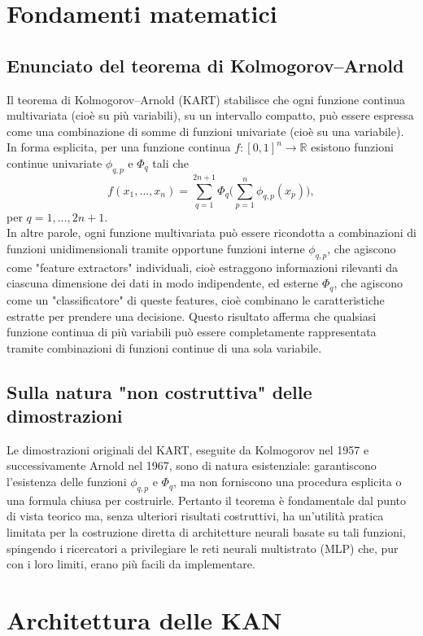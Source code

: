 \documentclass[a4paper,12pt]{report}
\begin{document}
	\section{Fondamenti matematici}
	
	\subsection{Enunciato del teorema di Kolmogorov--Arnold}
	Il teorema di Kolmogorov–Arnold (KART) stabilisce che ogni funzione continua multivariata (cioè su più variabili), su un intervallo compatto, può essere espressa come una combinazione di somme di funzioni univariate (cioè su una variabile). In forma esplicita, per una funzione continua \(f:[0,1]^n \to \mathbb{R}\) esistono funzioni continue univariate \(\phi_{q,p}\) e \(\Phi_q\) tali che
	\[
	f(x_1,\dots,x_n)=\sum_{q=1}^{2n+1}\Phi_q\!\Biggl(\sum_{p=1}^n \phi_{q,p}(x_p)\Biggr),
	\]
	per \(q=1,\dots,2n+1\). \\
	In altre parole, ogni funzione multivariata può essere ricondotta a combinazioni di funzioni unidimensionali tramite opportune funzioni interne \(\phi_{q,p}\), che agiscono come "feature extractors" individuali, cioè estraggono informazioni rilevanti da ciascuna dimensione dei dati in modo indipendente, ed esterne \(\Phi_q\), che agiscono come un "classificatore" di queste features, cioè combinano le caratteristiche estratte per prendere una decisione. Questo risultato afferma che qualsiasi funzione continua di più variabili può essere completamente rappresentata tramite combinazioni di funzioni continue di una sola variabile.
	
	\subsection{Sulla natura "non costruttiva" delle dimostrazioni}
	Le dimostrazioni originali del KART, eseguite da Kolmogorov nel 1957 e successivamente Arnold nel 1967, sono di natura esistenziale: garantiscono l'esistenza delle funzioni \(\phi_{q,p}\) e \(\Phi_q\), ma non forniscono una procedura esplicita o una formula chiusa per costruirle. Pertanto il teorema è fondamentale dal punto di vista teorico ma, senza ulteriori risultati costruttivi, ha un'utilità pratica limitata per la costruzione diretta di architetture neurali basate su tali funzioni, spingendo i ricercatori a privilegiare le reti neurali multistrato (MLP) che, pur con i loro limiti, erano più facili da implementare.
	
	\section{Architettura delle KAN}
	
\end{document}
